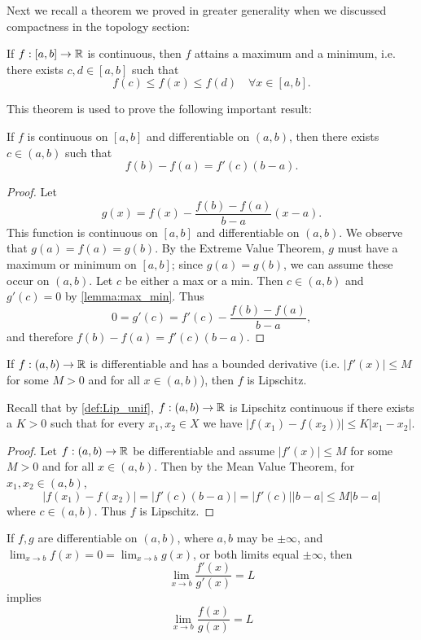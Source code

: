 \documentclass{article}
\begin{document}
Next we recall a theorem we proved in greater generality when we discussed compactness in the topology section:
\begin{theorem}
If $f:[a,b] \to {\mathbb{R}}$ is continuous, then $f$ attains a maximum and a minimum, i.e. there exists $c,d \in [a,b]$ such that
$$ f(c) \leq f(x) \leq f(d) \quad \forall x \in [a,b] .$$
\end{theorem}

This theorem is used to prove the following important result:

\begin{theorem}
If $f$ is continuous on $[a,b]$ and differentiable on $(a,b)$, then there exists $c \in (a,b)$ such that 
$$f(b) - f(a) = f'(c)(b-a) .$$
\end{theorem}
\begin{proof}
Let $$ g(x) = f(x) - \frac{f(b) - f(a)}{b-a} (x-a).$$
This function is continuous on $[a,b]$ and differentiable on $(a,b)$. We observe that $g(a) = f(a) = g(b)$. By the Extreme Value Theorem, $g$ must have a maximum or minimum on $[a,b]$; since $g(a)=g(b)$, we can assume these occur on $(a,b)$. Let $c$ be either a max or a min. Then $c \in (a,b)$ and $g'(c) = 0$ by \cref{lemma:max_min}. Thus
$$ 0 = g'(c) = f'(c) - \frac{f(b) - f(a)}{b-a},$$
and therefore $f(b) - f(a)= f'(c)(b-a)$.
\end{proof}

\begin{corollary}
If $f:(a,b) \to {\mathbb{R}}$ is differentiable and has a bounded derivative (i.e. $|f'(x)| \leq M$ for some $M >0$ and for all $x \in (a,b)$), then $f$ is Lipschitz.
\end{corollary}

Recall that by \cref{def:Lip_unif}, $f:(a,b) \to {\mathbb{R}}$ is Lipschitz continuous if there exists a $K > 0$ such that for every $x_1,x_2\in X$ we have  $|f(x_1)-f(x_2)) | \leq K |x_1 -x_2|$.

\begin{proof}
Let $f:(a,b) \to {\mathbb{R}}$ be differentiable and assume $|f'(x)| \leq M$ for some $M >0$ and for all $x \in (a,b)$. Then by the Mean Value Theorem,
for $x_1, x_2 \in (a,b)$, 
$$|f(x_1) - f(x_2)| = |f'(c) (b-a)| = |f'(c)| |b-a| \leq M |b-a|$$
where $c \in (a,b)$. Thus $f$ is Lipschitz.
\end{proof}

\begin{theorem}
If $f,g$ are differentiable on $(a,b)$, where $a,b$ may be $\pm \infty$, and $\lim_{x \to b} f(x) = 0 = \lim_{x \to b} g(x)$, or both limits equal $\pm \infty$, then 
$$ \lim_{x \to b} \frac{f'(x)}{g'(x)} = L$$
implies
$$ \lim_{x \to b} \frac{f(x)}{g(x)} = L$$
\end{theorem}
\end{document}
